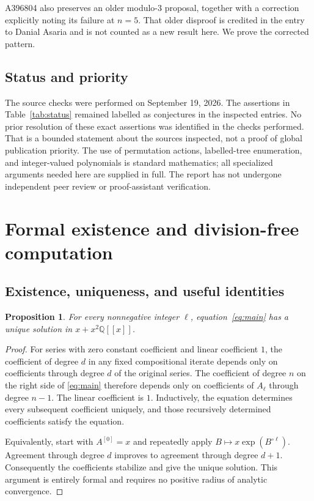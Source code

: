 \documentclass[11pt,letterpaper]{article}
\newtheorem{proposition}[theorem]{Proposition}
\theoremstyle{definition}
\theoremstyle{remark}
\newcommand{\Q}{\mathbb Q}
\begin{document}
A396804 also preserves an older modulo-$3$ proposal, together with a
correction explicitly noting its failure at $n=5$. That older disproof is
credited in the entry to Danial Asaria and is not counted as a new result
here. We prove the corrected pattern.

\subsection{Status and priority}
The source checks were performed on September 19, 2026. The assertions in
Table~\ref{tab:status} remained labelled as conjectures in the inspected
entries. No prior resolution of these exact assertions was identified in
the checks performed. That is a bounded statement about the sources
inspected, not a proof of global publication priority. The use of
permutation actions, labelled-tree enumeration, and integer-valued
polynomials is standard mathematics; all specialized arguments needed
here are supplied in full. The report has not undergone independent peer
review or proof-assistant verification.

\section{Formal existence and division-free computation}\label{sec:formal}
\subsection{Existence, uniqueness, and useful identities}
\begin{proposition}\label{prop:exist}
For every nonnegative integer $\ell$, equation~\eqref{eq:main} has a unique
solution in $x+x^2\Q[[x]]$.
\end{proposition}
\begin{proof}
For series with zero constant coefficient and linear coefficient $1$,
the coefficient of degree $d$ in any fixed compositional iterate depends
only on coefficients through degree $d$ of the original series.
The coefficient of degree $n$ on the right side of \eqref{eq:main}
therefore depends only on coefficients of $A_\ell$ through degree $n-1$.
The linear coefficient is $1$. Inductively, the equation determines every
subsequent coefficient uniquely, and those recursively determined
coefficients satisfy the equation.

Equivalently, start with $A^{[0]}=x$ and repeatedly apply
$B\mapsto x\exp(B^{\circ\ell})$. Agreement through degree $d$ improves to
agreement through degree $d+1$. Consequently the coefficients stabilize
and give the unique solution. This argument is entirely formal and
requires no positive radius of analytic convergence.
\end{proof}
\end{document}
